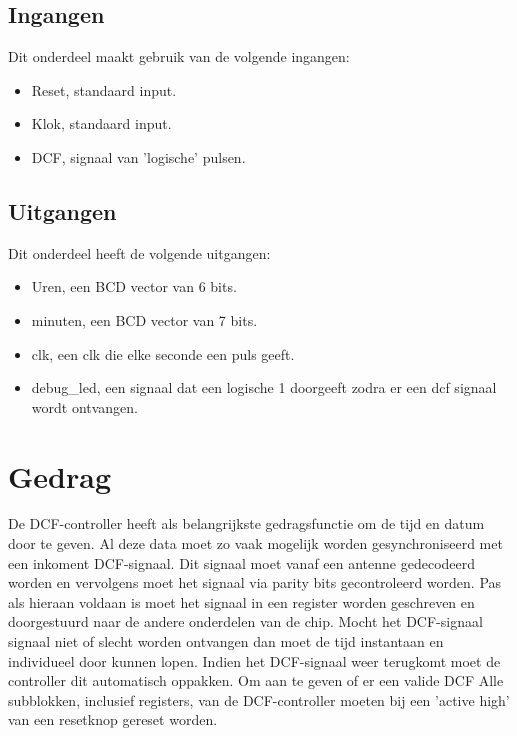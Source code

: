 \subsection{Ingangen}
Dit onderdeel maakt gebruik van de volgende ingangen: 

\begin{itemize}[nolistsep]
\item Reset, standaard input.
\item Klok, standaard input.
\item DCF, signaal van 'logische' pulsen.
\end{itemize}
\noindent

\subsection{Uitgangen}
Dit onderdeel heeft de volgende uitgangen:
\begin{itemize}[nolistsep]
\item Uren, een BCD vector van 6 bits.
\item minuten, een BCD vector van 7 bits.
\item clk, een clk die elke seconde een puls geeft.
\item debug\_led, een signaal dat een logische 1 doorgeeft zodra er een dcf signaal wordt ontvangen.
\end{itemize}


\section{Gedrag}
De DCF-controller heeft als belangrijkste gedragsfunctie om de tijd en datum door te geven. Al deze data moet zo vaak mogelijk worden gesynchroniseerd met een inkoment DCF-signaal. Dit signaal moet vanaf een antenne gedecodeerd worden en vervolgens moet het signaal via parity bits gecontroleerd worden. Pas als hieraan voldaan is moet het signaal in een register worden geschreven en doorgestuurd naar de andere onderdelen van de chip. Mocht het DCF-signaal signaal niet of slecht worden ontvangen dan moet de tijd instantaan en individueel door kunnen lopen. Indien het DCF-signaal weer terugkomt moet de controller dit automatisch oppakken. Om aan te geven of er een valide DCF
Alle subblokken, inclusief registers, van de DCF-controller moeten bij een 'active high' van een resetknop gereset worden.